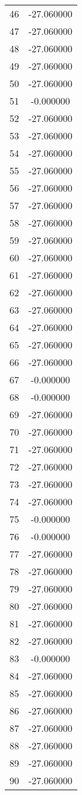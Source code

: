 \documentclass[12pt]{article}
\begin{document}
\begin{longtable}{@{}cc@{}}
46 & -27.060000 \\
47 & -27.060000 \\
48 & -27.060000 \\
49 & -27.060000 \\
50 & -27.060000 \\
51 & -0.000000 \\
52 & -27.060000 \\
53 & -27.060000 \\
54 & -27.060000 \\
55 & -27.060000 \\
56 & -27.060000 \\
57 & -27.060000 \\
58 & -27.060000 \\
59 & -27.060000 \\
60 & -27.060000 \\
61 & -27.060000 \\
62 & -27.060000 \\
63 & -27.060000 \\
64 & -27.060000 \\
65 & -27.060000 \\
66 & -27.060000 \\
67 & -0.000000 \\
68 & -0.000000 \\
69 & -27.060000 \\
70 & -27.060000 \\
71 & -27.060000 \\
72 & -27.060000 \\
73 & -27.060000 \\
74 & -27.060000 \\
75 & -0.000000 \\
76 & -0.000000 \\
77 & -27.060000 \\
78 & -27.060000 \\
79 & -27.060000 \\
80 & -27.060000 \\
81 & -27.060000 \\
82 & -27.060000 \\
83 & -0.000000 \\
84 & -27.060000 \\
85 & -27.060000 \\
86 & -27.060000 \\
87 & -27.060000 \\
88 & -27.060000 \\
89 & -27.060000 \\
90 & -27.060000 \\

\end{longtable}
\end{document}
